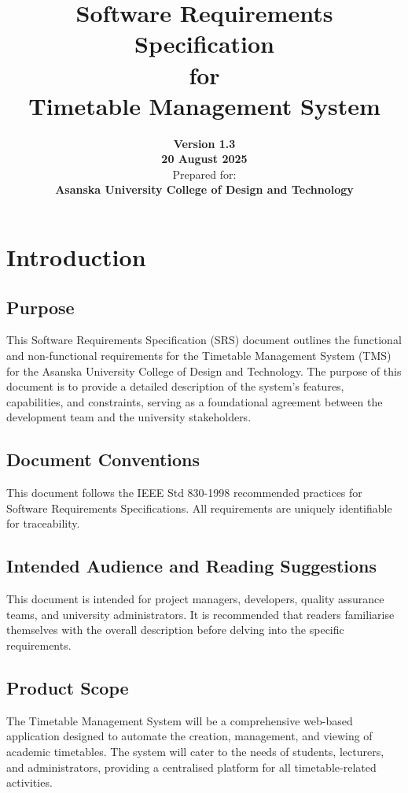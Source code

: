 \documentclass[11pt, a4paper]{article}
\title{
    \vspace{2cm}
    \textbf{Software Requirements Specification \\ for \\ Timetable Management System}
    \vspace{1cm}
}
\author{
    \textbf{Version 1.3} \\
    \vspace{0.5cm}
    \textbf{20 August 2025} \\
    \vspace{2cm}
    Prepared for: \\
    \textbf{Asanska University College of Design and Technology}
}
\date{} %
\begin{document}
\maketitle
\thispagestyle{empty} %
\newpage

\tableofcontents
\thispagestyle{empty} %
\newpage

\setcounter{page}{1} %

\section{Introduction}
\label{sec:introduction}

\subsection{Purpose}
\label{sec:purpose}
This Software Requirements Specification (SRS) document outlines the functional and non-functional requirements for the Timetable Management System (TMS) for the Asanska University College of Design and Technology. The purpose of this document is to provide a detailed description of the system's features, capabilities, and constraints, serving as a foundational agreement between the development team and the university stakeholders.

\subsection{Document Conventions}
\label{sec:conventions}
This document follows the IEEE Std 830-1998 recommended practices for Software Requirements Specifications. All requirements are uniquely identifiable for traceability.

\subsection{Intended Audience and Reading Suggestions}
\label{sec:audience}
This document is intended for project managers, developers, quality assurance teams, and university administrators. It is recommended that readers familiarise themselves with the overall description before delving into the specific requirements.

\subsection{Product Scope}
\label{sec:scope}
The Timetable Management System will be a comprehensive web-based application designed to automate the creation, management, and viewing of academic timetables. The system will cater to the needs of students, lecturers, and administrators, providing a centralised platform for all timetable-related activities.
\end{document}
